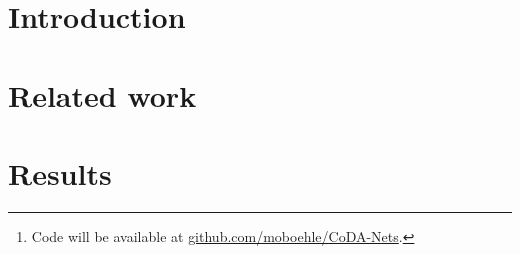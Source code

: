 \documentclass[final]{cvpr}
\begin{document}
\begin{abstract}
We introduce a new family of neural network models called Convolutional Dynamic Alignment Networks\footnote{Code will be available at \url{github.com/moboehle/CoDA-Nets}.} (CoDA-Nets),
which are performant classifiers with a high degree of inherent interpretability. 
{Their core building blocks are Dynamic Alignment Units (DAUs), which \mbox{{linearly transform}} their input with weight vectors that \mbox{{dynamically align}} with task-relevant patterns.} As a result, CoDA-Nets model the classification prediction through a series of input-dependent linear transformations, allowing for linear decomposition of the output into individual input contributions.
    Given the alignment of the DAUs, the resulting contribution maps 
    align with discriminative input patterns. 
These model-inherent decompositions are of high visual quality and  outperform existing attribution methods under quantitative metrics. 
Further, CoDA-Nets constitute performant classifiers, achieving on par results 
to ResNet and VGG models on e.g. CIFAR-10 and TinyImagenet.

\end{abstract}
%
%
\section{Introduction}
\label{sec:intro}

\section{Related work}
\label{sec:related}


\section{Results}
\label{sec:results}




{\small
\justifying


\justifying
}
\clearpage

\end{document}
